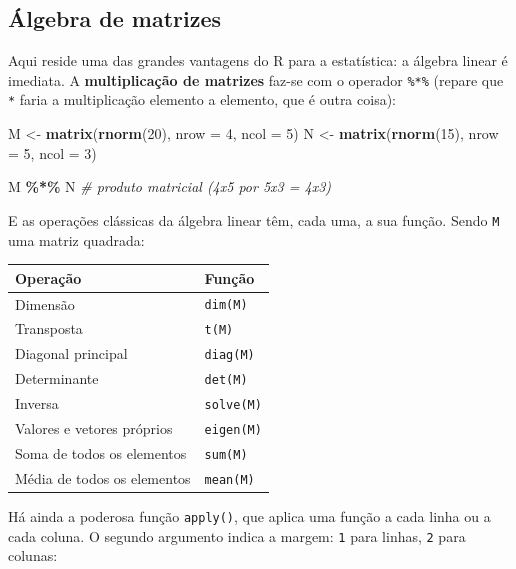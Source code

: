 \documentclass[
  portuguese,
  11pt,
  openany]{book}
\newenvironment{Shaded}{\begin{snugshade}}{\end{snugshade}}
\newcommand{\AttributeTok}[1]{\textcolor[rgb]{0.13,0.29,0.53}{#1}}
\newcommand{\CommentTok}[1]{\textcolor[rgb]{0.56,0.35,0.01}{\textit{#1}}}
\newcommand{\DecValTok}[1]{\textcolor[rgb]{0.00,0.00,0.81}{#1}}
\newcommand{\FunctionTok}[1]{\textcolor[rgb]{0.13,0.29,0.53}{\textbf{#1}}}
\newcommand{\NormalTok}[1]{#1}
\newcommand{\OtherTok}[1]{\textcolor[rgb]{0.56,0.35,0.01}{#1}}
\newcommand{\SpecialCharTok}[1]{\textcolor[rgb]{0.81,0.36,0.00}{\textbf{#1}}}
\newcounter{none} %
\begin{document}
\subsection{Álgebra de matrizes}\label{uxe1lgebra-de-matrizes}

Aqui reside uma das grandes vantagens do R para a estatística: a álgebra linear é
imediata. A \textbf{multiplicação de matrizes} faz-se com o operador \texttt{\%*\%} (repare que
\texttt{*} faria a multiplicação elemento a elemento, que é outra coisa):

\begin{Shaded}
\begin{Highlighting}[]
\NormalTok{M }\OtherTok{\textless{}{-}} \FunctionTok{matrix}\NormalTok{(}\FunctionTok{rnorm}\NormalTok{(}\DecValTok{20}\NormalTok{), }\AttributeTok{nrow =} \DecValTok{4}\NormalTok{, }\AttributeTok{ncol =} \DecValTok{5}\NormalTok{)}
\NormalTok{N }\OtherTok{\textless{}{-}} \FunctionTok{matrix}\NormalTok{(}\FunctionTok{rnorm}\NormalTok{(}\DecValTok{15}\NormalTok{), }\AttributeTok{nrow =} \DecValTok{5}\NormalTok{, }\AttributeTok{ncol =} \DecValTok{3}\NormalTok{)}

\NormalTok{M }\SpecialCharTok{\%*\%}\NormalTok{ N        }\CommentTok{\# produto matricial (4x5 por 5x3 = 4x3)}
\end{Highlighting}
\end{Shaded}

E as operações clássicas da álgebra linear têm, cada uma, a sua função. Sendo \texttt{M}
uma matriz quadrada:

{\def\LTcaptype{none} %
\begin{longtable}[]{@{}ll@{}}
\toprule\noalign{}
Operação & Função \\
\midrule\noalign{}
\endhead
\bottomrule\noalign{}
\endlastfoot
Dimensão & \texttt{dim(M)} \\
Transposta & \texttt{t(M)} \\
Diagonal principal & \texttt{diag(M)} \\
Determinante & \texttt{det(M)} \\
Inversa & \texttt{solve(M)} \\
Valores e vetores próprios & \texttt{eigen(M)} \\
Soma de todos os elementos & \texttt{sum(M)} \\
Média de todos os elementos & \texttt{mean(M)} \\
\end{longtable}
}

Há ainda a poderosa função \texttt{apply()}, que aplica uma função a cada linha ou a cada
coluna. O segundo argumento indica a margem: \texttt{1} para linhas, \texttt{2} para colunas:
\end{document}
